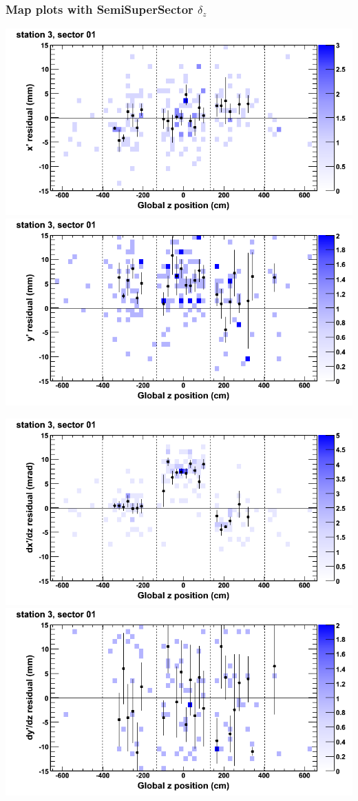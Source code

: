 \documentclass[compress]{beamer}
\begin{document}
\begin{frame}
\frametitle{Map plots with SemiSuperSector $\delta_z$}
\includegraphics[width=0.5\linewidth]{zfit_mapplots/DTvsz_st3sec01_x.png}
\includegraphics[width=0.5\linewidth]{zfit_mapplots/DTvsz_st3sec01_y.png}

\includegraphics[width=0.5\linewidth]{zfit_mapplots/DTvsz_st3sec01_dxdz.png}
\includegraphics[width=0.5\linewidth]{zfit_mapplots/DTvsz_st3sec01_dydz.png}
\end{frame}
\end{document}
